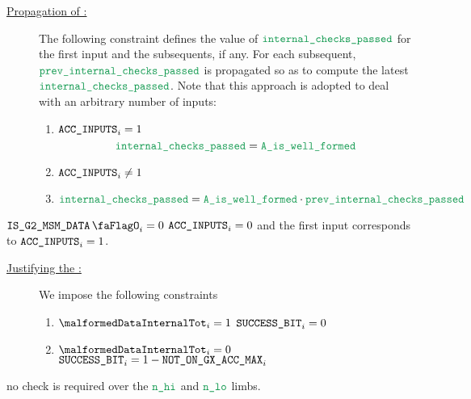 \begin{description}
    \item[\underline{Propagation of \locInternalChecksPassed:}]
          The following constraint defines the value of $\locInternalChecksPassed$ for the first input and the subsequents, if any.
          For each subsequent, $\locPreviousInternalChecksPassed$ is propagated so as to compute the latest $\locInternalChecksPassed$.
          Note that this approach is adopted to deal with an arbitrary number of inputs:
          \begin{enumerate}
              \item \If $\texttt{ACC\_INPUTS}_{i} = 1$ \Then
                    \[
                        \locInternalChecksPassed = \locAIsWellFormed 
                    \]
              \item \If $\texttt{ACC\_INPUTS}_{i} \neq 1$ \Then
                    \item $\locInternalChecksPassed = \locAIsWellFormed \cdot \locPreviousInternalChecksPassed$
          \end{enumerate}
\end{description}
\saNote{} \If $\isBlsGTwoMsmData_{i} = 0$ \Then $\texttt{ACC\_INPUTS}_{i} = 0$ and the first input corresponds to $\texttt{ACC\_INPUTS}_{i} = 1$.
\begin{description}
    \item[\underline{Justifying the \blsSuccessBit{}:}]
          We impose the following constraints
          \begin{enumerate}
              \item \If $\malformedDataInternalTot _{i} = 1$ \Then $\texttt{SUCCESS\_BIT} _{i} = 0$
              \item \If $\malformedDataInternalTot _{i} = 0$  \Then $\texttt{SUCCESS\_BIT}_{i} = 1 - \texttt{NOT\_ON\_GX\_ACC\_MAX} _{i}$
          \end{enumerate}
\end{description}

\saNote{} no check is required over the $\locNHi$ and $\locNLo$ limbs.
